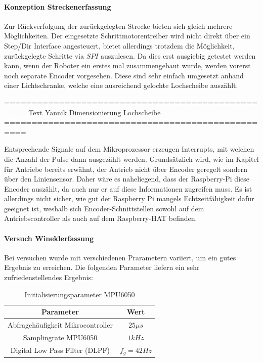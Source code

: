 \documentclass[main.tex]{subfiles} %
\begin{document}
\paragraph{Konzeption Streckenerfassung}
Zur Rückverfolgung der zurückgelegten Strecke bieten sich gleich mehrere
Möglichkeiten. Der eingesetzte Schrittmotorentreiber wird nicht direkt über ein
Step/Dir Interface angesteuert, bietet allerdings trotzdem die Möglichkeit,
zurückgelegte Schritte via $SPI$ auszulesen. Da dies erst ausgiebig getestet
werden kann, wenn der Roboter ein erstes mal zusammengebaut wurde, werden
vorerst noch separate Encoder vorgesehen. Diese sind sehr einfach umgesetzt
anhand einer Lichtschranke, welche eine ausreichend gelochte Lochscheibe
auszählt.

==================================================
Text Yannik Dimensionierung Lochscheibe
==================================================

Entsprechende Signale auf dem Mikroprozessor erzeugen Interrupts, mit welchen
die Anzahl der Pulse dann ausgezählt werden. Grundsätzlich wird, wie im Kapitel
für Antriebe bereits erwähnt, der Antrieb nicht über Encoder geregelt sondern
über den Liniensensor. Daher wäre es naheliegend, dass der Raspberry-Pi diese
Encoder auszählt, da auch nur er auf diese Informationen zugreifen muss. Es ist
allerdings nicht sicher, wie gut der Raspberry Pi mangels Echtzeitfähigkeit
dafür geeignet ist, weshalb sich Encoder-Schnittstellen sowohl auf dem
Antriebscontroller als auch auf dem Raspberry-HAT befinden.

\paragraph{Versuch Wineklerfassung}
Bei versuchen wurde mit verschiedenen Prarametern variiert, um ein gutes
Ergebnis zu erreichen. Die folgenden Parameter liefern ein sehr
zufriedenstellendes Ergebnis:

\begin{table}[h]                                    %
    \centering
    \begin{tabular}{|c|c|}                        %
        \hline
        Parameter                         & Wert         \\ \hline
        Abfragehäufigkeit Mikrocontroller & $25 \mu s$   \\ \hline
        Samplingrate MPU6050              & $1 kHz$      \\ \hline
        Digital Low Pass Filter (DLPF)    & $f_g = 42Hz$ \\ \hline
    \end{tabular}
    \caption{Initialisierungsparameter MPU6050}
    \label{tab:params_mpu6050}
\end{table}
\end{document}
